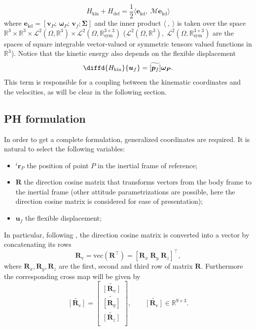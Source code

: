 \documentclass{svjour3}                     %
\newcommand{\crmat}[1]{\ensuremath{\widetilde{\left[#1\right]}}}
\begin{document}
\begin{equation}
H_{\text{kin}} + H_{\text{def}} = \frac{1}{2} \langle \bm{e}_{\text{kd}}, \ \bm{\mathcal{M}} \bm{e}_{\text{kd}} \rangle
\end{equation}
where $\bm{e}_{\text{kd}} = [\bm{v}_P; \, \bm{\omega}_P; \, \bm{v}_f; \bm{\Sigma}]$ and the inner product $\langle \ , \ \rangle$ is taken over the space $\mathbb{R}^3 \times \mathbb{R}^3 \times \mathscr{L}^2(\Omega, \mathbb{R}^3) \times \mathscr{L}^2(\Omega, \mathbb{R}^{3\times 3}_{\text{sym}})$ ($\mathscr{L}^2(\Omega, \mathbb{R}^3), \; \mathscr{L}^2(\Omega, \mathbb{R}^{3\times 3}_{\text{sym}})$ are the spaces of square integrable vector-valued or symmetric tensors valued functions in $\mathbb{R}^3$). Notice that the kinetic energy also depends on the flexible displacement
\[
\diffd{H_{\text{kin}}}{\bm{u}_f} = \crmat{\bm{p}_f} \bm{\omega_{P}}.
\]
This term is responsible for a coupling between the kinematic coordinates and the velocities, as will be clear in the following section. 

\subsection{PH formulation}
In order to get a complete formulation, generalized coordinates are required. It is natural to select the following variables:
\begin{itemize}
	\item $^i \bm{r}_P$ the position of point $P$ in the inertial frame of reference;
	\item $\bm{R}$ the direction cosine matrix that transforms vectors from the body frame to the inertial frame (other attitude parametrizations are possible, here the direction cosine matrix is considered for ease of presentation);
	\item $\bm{u}_f$ the flexible displacement;
\end{itemize}

In particular, following \cite{attitude_ph}, the direction cosine matrix is converted into a vector by concatenating its rows
\begin{equation*}
\bm{R}_{\text{v}} = \text{vec}(\bm{R}^\top) = [\bm{R}_x \; \bm{R}_y \; \bm{R}_z]^\top,
\end{equation*}
where $\bm{R}_{x}, \bm{R}_{y}, \bm{R}_{z}$ are the first, second and third row of matrix $\bm{R}$. Furthermore the corresponding cross map will be given by
\begin{equation*}
\crmat{\bm{R}_{\text{v}}} = 
\begin{bmatrix}
\crmat{\bm{R}_x} \\
\crmat{\bm{R}_y} \\
\crmat{\bm{R}_z} \\
\end{bmatrix}, \qquad 
\crmat{\bm{R}_{\text{v}}} \in \mathbb{R}^{9 \times 3}.
\end{equation*}
\end{document}
